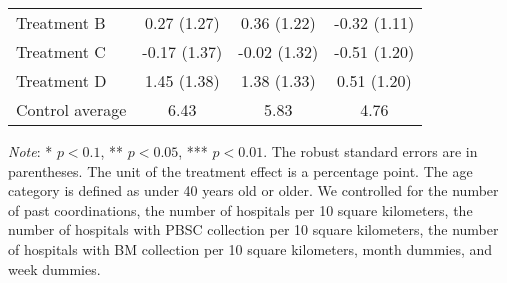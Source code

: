 \documentclass[12pt, a4paper]{article}
\begin{document}
\begin{table}[H]
\begin{threeparttable}
\begin{tabular}[t]{lccc}
\hspace{1em}Treatment B & 0.27 (1.27) & 0.36 (1.22) & -0.32 (1.11)\\
\hspace{1em}Treatment C & -0.17 (1.37) & -0.02 (1.32) & -0.51 (1.20)\\
\hspace{1em}Treatment D & 1.45 (1.38) & 1.38 (1.33) & 0.51 (1.20)\\
\hspace{1em}Control average & 6.43 & 5.83 & 4.76\\
\bottomrule
\end{tabular}
\begin{tablenotes}
\item \emph{Note}: * $p < 0.1$, ** $p < 0.05$, *** $p < 0.01$. The robust standard errors are in parentheses. The unit of the treatment effect is a percentage point. The age category is defined as under 40 years old or older. We controlled for the number of past coordinations, the number of hospitals per 10 square kilometers, the number of hospitals with PBSC collection per 10 square kilometers, the number of hospitals with BM collection per 10 square kilometers, month dummies, and week dummies.
\end{tablenotes}
\end{threeparttable}
\end{table}

\clearpage


\end{document}
